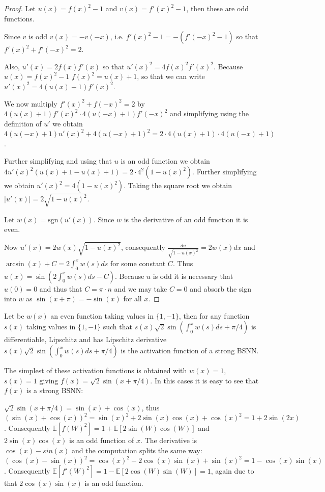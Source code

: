 \documentclass{letter}
\begin{document}
\begin{proof}
Let $u(x)=f(x)^2-1$ and $v(x)=f'(x)^2-1$, then these are odd functions.

Since $v$ is odd $v(x)=-v(-x)$, i.e. $f'(x)^2-1 = -(f'(-x)^2-1)$ so that $f'(x)^2+f'(-x)^2=2$.

Also, $u'(x)=2f(x)f'(x)$ so that $u'(x)^2=4f(x)^2f'(x)^2$. Because $u(x)=f(x)^2-1$ $f(x)^2=u(x)+1$, so that we can write $u'(x)^2=4(u(x)+1)f'(x)^2$.

We now multiply $f'(x)^2 + f(-x)^2=2$ by $4(u(x)+1)f'(x)^2\cdot 4(u(-x)+1)f'(-x)^2$ and simplifying using the definition of $u'$ we obtain $4(u(-x)+1)u'(x)^2 + 4(u(-x)+1)^2=2\cdot 4(u(x)+1)\cdot 4(u(-x)+1)$.

Further simplifying and using that $u$ is an odd function we obtain $4u'(x)^2(u(x)+1-u(x)+1)=2\cdot 4^2(1-u(x)^2)$. Further simplifying we obtain $u'(x)^2=4(1-u(x)^2)$. Taking the square root we obtain $|u'(x)|=2\sqrt{1-u(x)^2}$.

Let $w(x)=\text{sgn}(u'(x))$. Since $w$ is the derivative of an odd function it is even.

Now $u'(x)=2w(x)\sqrt{1-u(x)^2}$, consequently $\frac{du}{\sqrt{1-u(x)^2}}=2w(x)dx$ and\newline $\arcsin(x)+C=2\int_0^x w(s)ds$ for some constant $C$. Thus $u(x)=\sin(2\int_0^x w(s)ds - C)$. Because $u$ is odd it is necessary that $u(0)=0$ and thus that $C=\pi\cdot n$ and we may take $C=0$ and absorb the sign into $w$ as $\sin(x + \pi)=-\sin(x)$ for all $x$.
\end{proof}

\begin{theorem}
Let be $w(x)$ an even function taking values in $\{1,-1\}$, then for any function $s(x)$ taking values in $\{1,-1\}$ such that $s(x)\sqrt{2}\sin(\int_0^xw(s)ds+\pi/4)$ is differentiable, Lipschitz and has Lipschitz derivative $s(x)\sqrt{2}\sin(\int_0^xw(s)ds+\pi/4)$ is the activation function of a strong BSNN.
\end{theorem}

The simplest of these activation functions is obtained with $w(x)=1$, $s(x)=1$ giving $f(x)=\sqrt{2}\sin(x+\pi/4)$. In this cases it is easy to see that $f(x)$ is a strong BSNN:

$\sqrt{2}\sin(x+\pi/4)=\sin(x)+\cos(x)$, thus $(\sin(x) + \cos(x))^2 = \sin(x)^2 + 2\sin(x)\cos(x) + \cos(x)^2 = 1 + 2\sin(2x)$. Consequently $\mathbb{E}[f(W)^2]=1 + \mathbb{E}[2\sin(W)\cos(W)]$ and $2\sin(x)\cos(x)$ is an odd function of $x$. The derivative is $\cos(x)-sin(x)$ and the computation splits the same way: $(\cos(x) - \sin(x))^2 = \cos(x)^2 - 2\cos(x)\sin(x) + \sin(x)^2=1 - \cos(x)\sin(x)$. Consequently $\mathbb{E}[f'(W)^2]= 1 - \mathbb{E}[2\cos(W)\sin(W)]=1$, again due to that $2\cos(x)\sin(x)$ is an odd function.
\end{document}
